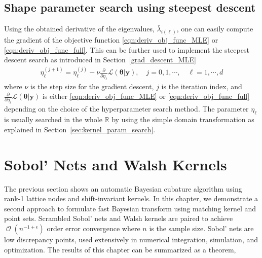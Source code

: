 \documentclass{svjour3}                     %
\DeclareMathOperator{\Order}{{\mathcal O}}
\newcommand{\bm}[1]{\boldsymbol{#1}}
\newcommand{\reals}{\mathbb{R}}
\newcommand{\vtheta}{{\bm{\theta}}}
\newcommand{\vy}{\bm{y}}
\newcommand\secref{Section~\ref}
\begin{document}
\subsection{Shape parameter search using steepest descent}
Using the obtained derivative of the eigenvalues, $\bar{\lambda}_{i(\ell)}$, one can easily compute the gradient of the objective function \eqref{eqn:deriv_obj_func_MLE} or \eqref{eqn:deriv_obj_func_full}. This can be further used to implement the steepest descent search as introduced in \secref{grad_descent_MLE} 
\begin{align*}
\eta^{(j+1)}_\ell = \eta^{(j)}_\ell - \nu \frac{\partial}{\partial \eta_\ell} \mathcal{L}(\vtheta | \vy), \quad j=0,1,\cdots,  \quad \ell = 1, \cdots, d
\end{align*}
where $\nu$ is the step size for the gradient descent, $j$ is the iteration index, and $\frac{\partial}{\partial \eta_\ell} \mathcal{L}(\vtheta | \vy)$ is either \eqref{eqn:deriv_obj_func_MLE} or \eqref{eqn:deriv_obj_func_full} depending on the choice of the hyperparameter search method. The parameter $\eta_\ell$ is usually searched in the whole $\reals$ by using the simple domain transformation as explained in Section~\ref{sec:kernel_param_search}.

























 

\section{Sobol' Nets and Walsh Kernels}
\label{sec:sobol_walsh}



The previous section shows an automatic Bayesian cubature algorithm using rank-1 lattice nodes and shift-invariant kernels. 
In this chapter, we demonstrate a second approach to formulate fast Bayesian transform using matching kernel and point sets. 
Scrambled Sobol' nets and Walsh kernels are paired to achieve $\Order(n^{-1 + \epsilon})$ order error convergence where $n$ is the sample size. 
Sobol' nets \cite{Sob67} are low discrepancy points, used extensively in numerical integration, simulation, and optimization. 
The results of this chapter can be summarized as a theorem,
\end{document}
